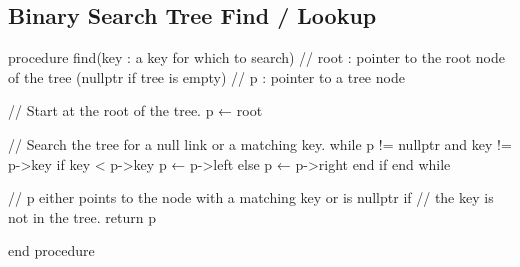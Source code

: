 \documentclass{report}
\begin{document}
    \bigbreak \noindent 
    \subsection{Binary Search Tree Find / Lookup}
    \bigbreak \noindent 
    \begin{cppcode}
procedure find(key : a key for which to search)
    // root   : pointer to the root node of the tree (nullptr if tree is empty)
    // p      : pointer to a tree node
    
    // Start at the root of the tree.
    p ← root
    
    // Search the tree for a null link or a matching key.
    while p != nullptr and key != p->key
        if key < p->key
            p ← p->left
        else
            p ← p->right
        end if
    end while

    // p either points to the node with a matching key or is nullptr if 
    // the key is not in the tree.
    return p

end procedure
    \end{cppcode}
















    





















    
    







    
    
\end{document}
